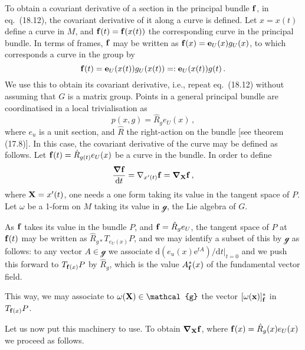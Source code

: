 \documentclass[a4paper,12pt]{article}
\def\d{\mathrm{d}}
\def\e{\mathrm{e}}
\begin{document}
To obtain a covariant derivative of a section in the principal bundle ${\bf f}$, in eq.\ (18.12), the covariant derivative of it along a curve is defined. Let $x=x(t)$ define a curve in $M$, and ${\bf f}(t) = {\bf f}(x(t))$ the corresponding curve in the principal bundle. In terms of frames, ${\bf f}$ may be written as ${\bf f}(x) = {\bf e}_U(x) g_U(x)$, to which corresponds a curve in the group by
\[
 {\bf f}(t) = {\bf e}_U(x(t)) g_U(x(t)) =: {\bf e}_U(x(t)) g(t)\,.
\]
We use this to obtain its covariant derivative, i.e., repeat eq.\ (18.12) without assuming that $G$ is a matrix group. Points in a general principal bundle are coordinatised in a local trivialisation as
\[
 p(x, g) = \hat{R}_g e_U(x)\,,
\]
where $e_u$ is a unit section, and $\hat{R}$ the right-action on the bundle [see theorem (17.8)]. In this case, the covariant derivative of the curve may be defined as follows. Let ${\bf f}(t) = \hat{R}_{g(t)} e_U(x)$ be a curve in the bundle. In order to define
\[
 \frac{\boldsymbol\nabla \bf f}{\d t} = \nabla_{x'(t)}{\bf f} = \boldsymbol\nabla_{\bf X}{\bf f}\,,
\]
where ${\bf X}=x'(t)$, one needs a one form taking its value in the tangent space of $P$. Let $\omega$ be a 1-form on $M$ taking its value in $\mathcal{g}$, the Lie algebra of $G$.

As ${\bf f}$ takes its value in the bundle $P$, and ${\bf f}=\hat{R}_g e_U$, the tangent space of $P$ at ${\bf f}(t)$ may be written as $\hat{R}_{g*} T_{e_U(x)}P$, and we may identify a subset of this by $\mathcal{g}$ as follows: to any vector $A\in\mathcal{g}$ we associate $\d(e_u(x) \e^{tA})/\d t|_{t=0}$ and we push this forward to $T_{{\bf f}(x)}P$ by $\hat{R}_g$, which is the value $A^*_{\bf f}(x)$ of the fundamental vector field.

This way, we may associate to $\omega({\bf X})\in\mathcal{g}$ the vector $[\omega({\bf x})]^*_{\bf f}$ in $T_{{\bf f}(x)}P$.

Let us now put this machinery to use.  To obtain $\boldsymbol\nabla_{\bf X}{\bf f}$, where ${\bf f}(x)=\hat{R}_g(x) e_U(x)$ we proceed as follows. 
\end{document}
